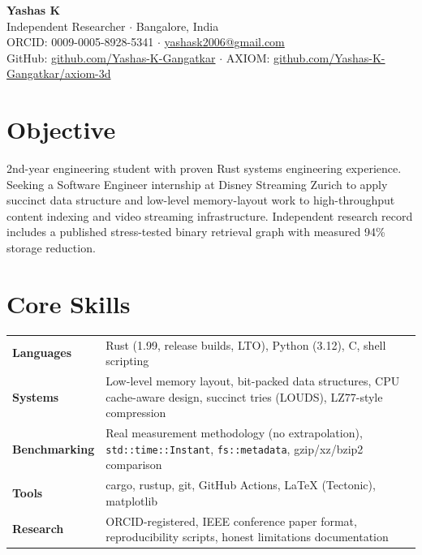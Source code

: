 \documentclass[11pt,a4paper]{article}
\begin{document}
\begin{center}
{\LARGE \textbf{Yashas K}}\\[3pt]
{\small Independent Researcher $\cdot$ Bangalore, India\\[2pt]
ORCID: 0009-0005-8928-5341 $\cdot$ \href{mailto:yashask2006@gmail.com}{yashask2006@gmail.com}\\[2pt]
GitHub: \href{https://github.com/Yashas-K-Gangatkar}{github.com/Yashas-K-Gangatkar} $\cdot$
AXIOM: \href{https://github.com/Yashas-K-Gangatkar/axiom-3d}{github.com/Yashas-K-Gangatkar/axiom-3d}}
\end{center}

\vspace{4pt}

\section*{Objective}
2nd-year engineering student with proven Rust systems engineering experience. Seeking a Software Engineer internship at Disney Streaming Zurich to apply succinct data structure and low-level memory-layout work to high-throughput content indexing and video streaming infrastructure. Independent research record includes a published stress-tested binary retrieval graph with measured 94\% storage reduction.

\section*{Core Skills}

\begin{tabularx}{\textwidth}{@{}l X@{}}
\textbf{Languages} & Rust (1.99, release builds, LTO), Python (3.12), C, shell scripting \\
\textbf{Systems} & Low-level memory layout, bit-packed data structures, CPU cache-aware design, succinct tries (LOUDS), LZ77-style compression \\
\textbf{Benchmarking} & Real measurement methodology (no extrapolation), \texttt{std::time::Instant}, \texttt{fs::metadata}, gzip/xz/bzip2 comparison \\
\textbf{Tools} & cargo, rustup, git, GitHub Actions, LaTeX (Tectonic), matplotlib \\
\textbf{Research} & ORCID-registered, IEEE conference paper format, reproducibility scripts, honest limitations documentation \\
\end{tabularx}
\end{document}
